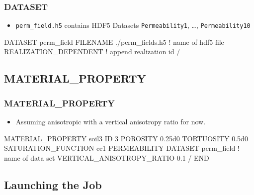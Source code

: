 \documentclass{beamer}
\newcommand\bluecomment[1]{{{\color{blue} #1}}}
\newcommand\magentacomment[1]{{{\color{magenta} #1}}}
\begin{document}
\begin{frame}\frametitle{DATASET}

\begin{itemize}
  \item \verb=perm_field.h5= contains HDF5 Datasets \verb=Permeability1=, \dots, \verb=Permeability10=
\end{itemize}

\begin{semiverbatim}

DATASET perm_field
  FILENAME ./perm_fields.h5   \bluecomment{! name of hdf5 file}
  REALIZATION_DEPENDENT       \bluecomment{! append realization id}
/
\end{semiverbatim}

\end{frame}

\subsection{MATERIAL\_PROPERTY}

\begin{frame}[fragile]\frametitle{MATERIAL\_PROPERTY}

\begin{itemize}
  \item Assuming anisotropic with a vertical anisotropy ratio for now.
\end{itemize}

\begin{semiverbatim}
MATERIAL_PROPERTY soil3
  ID 3
  POROSITY 0.25d0
  TORTUOSITY 0.5d0
  SATURATION_FUNCTION cc1
  PERMEABILITY
    \magentacomment{DATASET perm_field}      \bluecomment{! name of data set}
    \magentacomment{VERTICAL_ANISOTROPY_RATIO 0.1}
  /
END
\end{semiverbatim}

\end{frame}

\subsection{Launching the Job}
\end{document}
